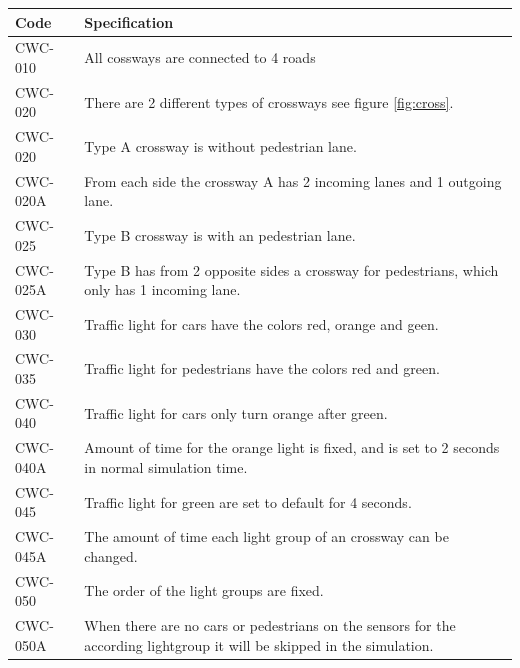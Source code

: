 \begin{tabularx}{\textwidth}{|p{2cm}X|}\hline
	Code & Specification \\\hline
	CWC-010 & All cossways are connected to 4 roads\\\hline
	CWC-020 & There are 2 different types of crossways see figure \ref{fig:cross}.\\\hline
	CWC-020 & Type A crossway is without pedestrian lane.\\\hline
	CWC-020A & From each side the crossway A has 2 incoming lanes and 1 outgoing lane.\\\hline
	CWC-025 & Type B crossway is with an pedestrian lane.\\\hline
	CWC-025A & Type B has from 2 opposite sides a crossway for pedestrians, which only has 1 incoming lane.\\\hline
	CWC-030 & Traffic light for cars have the colors red, orange and geen.\\\hline
	CWC-035 & Traffic light for pedestrians have the colors red and green.\\\hline
	CWC-040 & Traffic light for cars only turn orange after green.\\\hline
	CWC-040A & Amount of time for the orange light is fixed, and is set to 2 seconds in normal simulation time.\\\hline
	CWC-045 & Traffic light for green are set to default for 4 seconds.\\\hline
	CWC-045A & The amount of time each light group of an crossway can be changed.\\\hline
	CWC-050 & The order of the light groups are fixed.\\\hline
	CWC-050A & When there are no cars or pedestrians on the sensors for the according lightgroup it will be skipped in the simulation.\\\hline
\end{tabularx}

\newpage
